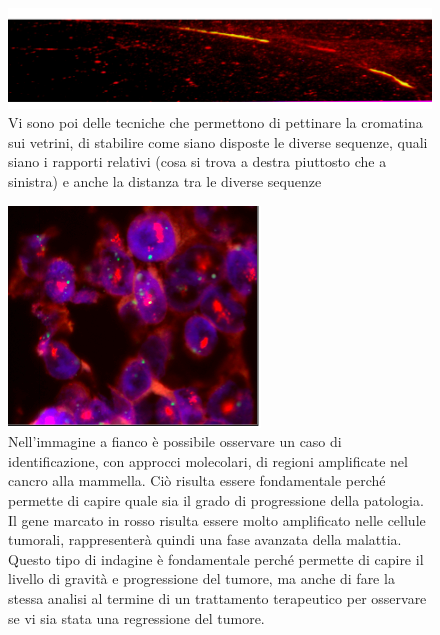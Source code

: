 \documentclass[11pt]{book}
\begin{document}
\begin{figure}[h!]
\centering
\includegraphics[scale=0.80]{img/12_cromatinapettinata.png}
\caption{Vi sono poi delle tecniche che permettono di pettinare la cromatina sui vetrini, di stabilire come siano disposte le diverse sequenze, quali siano i rapporti relativi (cosa si trova a destra piuttosto che a sinistra) e anche la distanza tra le diverse sequenze}
\label{}
\end{figure}

\begin{figure}[h!]
\centering
\includegraphics[scale=0.70]{img/13_celltumorali.png}
\caption{Nell’immagine a fianco è possibile osservare un caso di identificazione, con approcci molecolari, di regioni amplificate nel cancro alla mammella. Ciò risulta essere fondamentale perché permette di capire quale sia il grado di progressione della patologia.
Il gene marcato in rosso risulta essere molto amplificato nelle cellule tumorali, rappresenterà quindi una fase avanzata della malattia. 
Questo tipo di indagine è fondamentale perché permette di capire il livello di gravità e progressione del tumore, ma anche di fare la stessa analisi al termine di un trattamento terapeutico per osservare se vi sia stata una regressione del tumore. }
\label{}
\end{figure}
\end{document}
